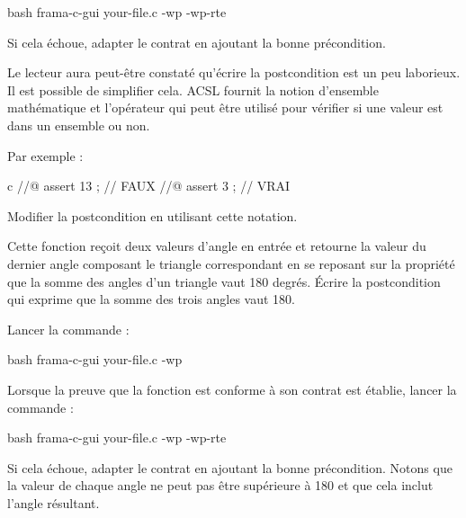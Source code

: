 \begin{CodeBlock}{bash}
frama-c-gui your-file.c -wp -wp-rte
\end{CodeBlock}


Si cela échoue, adapter le contrat en ajoutant la bonne précondition.


Le lecteur aura peut-être constaté qu'écrire la postcondition est un peu
laborieux. Il est possible de simplifier cela. ACSL fournit la notion
d'ensemble mathématique et l'opérateur  qui
peut être utilisé pour vérifier si une valeur est dans un ensemble ou non.


Par exemple :

\begin{CodeBlock}{c}
//@ assert 13  ; // FAUX
//@ assert 3   ; // VRAI
\end{CodeBlock}


Modifier la postcondition en utilisant cette notation.




Cette fonction reçoit deux valeurs d'angle en entrée et retourne
la valeur du dernier angle composant le triangle correspondant en se
reposant sur la propriété que la somme des angles d'un triangle vaut
180 degrés. Écrire la postcondition qui exprime que la somme des trois
angles vaut 180.




Lancer la commande :


\begin{CodeBlock}{bash}
frama-c-gui your-file.c -wp
\end{CodeBlock}


Lorsque la preuve que la fonction est conforme à son contrat est établie, lancer
la commande :

\begin{CodeBlock}{bash}
frama-c-gui your-file.c -wp -wp-rte
\end{CodeBlock}


Si cela échoue, adapter le contrat en ajoutant la bonne précondition.
Notons que la valeur de chaque angle ne peut pas être supérieure à 180
et que cela inclut l'angle résultant.
